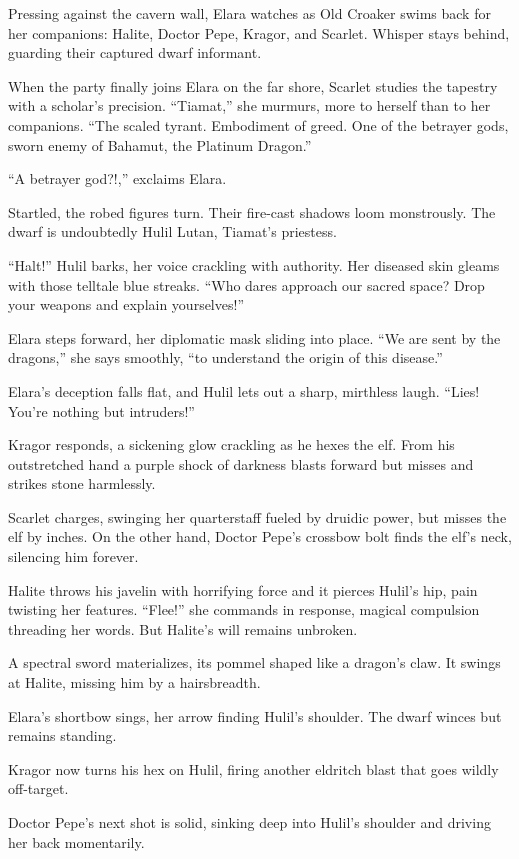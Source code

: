 \documentclass[
  letterpaper,12pt,twoside,twocolumn,openany,
  nodeprecatedcode,bg=full]{dndbook}
\begin{document}
Pressing against the cavern wall, Elara watches as Old Croaker swims
back for her companions: Halite, Doctor Pepe, Kragor, and Scarlet.
Whisper stays behind, guarding their captured dwarf informant.

When the party finally joins Elara on the far shore, Scarlet studies the
tapestry with a scholar's precision. ``Tiamat,'' she murmurs, more to
herself than to her companions. ``The scaled tyrant. Embodiment of
greed. One of the betrayer gods, sworn enemy of Bahamut, the Platinum
Dragon.''

``A betrayer god?!,'' exclaims Elara.

Startled, the robed figures turn. Their fire-cast shadows loom
monstrously. The dwarf is undoubtedly Hulil Lutan, Tiamat's priestess.

``Halt!'' Hulil barks, her voice crackling with authority. Her diseased
skin gleams with those telltale blue streaks. ``Who dares approach our
sacred space? Drop your weapons and explain yourselves!''

Elara steps forward, her diplomatic mask sliding into place. ``We are
sent by the dragons,'' she says smoothly, ``to understand the origin of
this disease.''

Elara's deception falls flat, and Hulil lets out a sharp, mirthless
laugh. ``Lies! You're nothing but intruders!''

Kragor responds, a sickening glow crackling as he hexes the elf. From
his outstretched hand a purple shock of darkness blasts forward but
misses and strikes stone harmlessly.

Scarlet charges, swinging her quarterstaff fueled by druidic power, but
misses the elf by inches. On the other hand, Doctor Pepe's crossbow bolt
finds the elf's neck, silencing him forever.

Halite throws his javelin with horrifying force and it pierces Hulil's
hip, pain twisting her features. ``Flee!'' she commands in response,
magical compulsion threading her words. But Halite's will remains
unbroken.

A spectral sword materializes, its pommel shaped like a dragon's claw.
It swings at Halite, missing him by a hairsbreadth.

Elara's shortbow sings, her arrow finding Hulil's shoulder. The dwarf
winces but remains standing.

Kragor now turns his hex on Hulil, firing another eldritch blast that
goes wildly off-target.

Doctor Pepe's next shot is solid, sinking deep into Hulil's shoulder and
driving her back momentarily.
\end{document}
